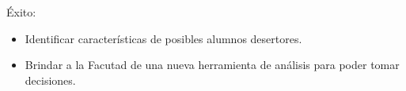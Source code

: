 
Éxito:
\begin{itemize}
\item Identificar características de posibles alumnos desertores.
\item Brindar a la Facutad de una nueva herramienta de análisis para poder tomar decisiones.
\end{itemize}
